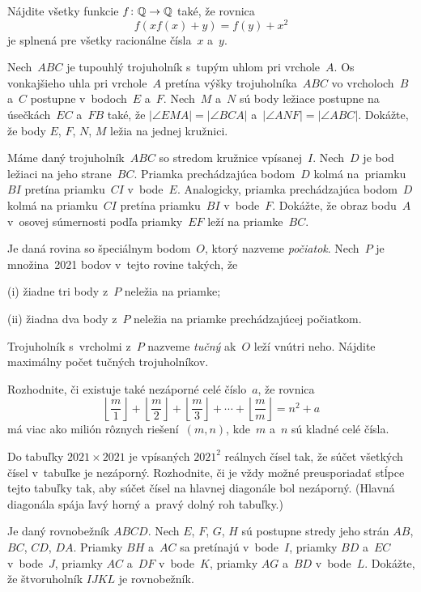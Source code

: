 {%
Nájdite všetky funkcie $f\colon\Bbb{Q}\to\Bbb{Q}$ také, že rovnica
$$
f(xf(x)+y)=f(y)+x^2
$$
je splnená pre všetky racionálne čísla~$x$ a~$y$.
}

{%
Nech~$ABC$ je tupouhlý trojuholník s~tupým uhlom pri vrchole~$A$. Os vonkajšieho uhla pri vrchole~$A$ pretína výšky trojuholníka~$ABC$ vo vrcholoch~$B$ a~$C$ postupne v~bodoch~$E$ a~$F$. Nech~$M$ a~$N$ sú body ležiace postupne na úsečkách~$EC$ a~$FB$ také, že $|\angle EMA| = |\angle BCA|$ a~$|\angle ANF| = |\angle ABC|$. Dokážte, že body $E$, $F$, $N$, $M$ ležia na jednej kružnici.
}

{%
Máme daný trojuholník~$ABC$ so stredom kružnice vpísanej~$I$. Nech~$D$ je bod ležiaci na jeho strane~$BC$. Priamka prechádzajúca bodom~$D$ kolmá na~priamku~$BI$ pretína priamku~$CI$ v~bode~$E$. Analogicky, priamka prechádzajúca bodom~$D$ kolmá na priamku~$CI$ pretína priamku~$BI$ v~bode~$F$. Dokážte, že obraz bodu~$A$ v~osovej súmernosti podľa priamky~$EF$ leží na priamke~$BC$.
}

{%
Je daná rovina so špeciálnym bodom~$O$, ktorý nazveme \emph{počiatok}. Nech~$P$ je množina~2021 bodov v~tejto rovine takých, že
\item{(i)} žiadne tri body z~$P$ neležia na priamke;
\item{(ii)} žiadna dva body z~$P$ neležia na priamke prechádzajúcej počiatkom.

Trojuholník s~vrcholmi z~$P$ nazveme \emph{tučný} ak~$O$ leží vnútri neho. Nájdite maximálny počet tučných trojuholníkov.
}

{%
Rozhodnite, či existuje také nezáporné celé číslo~$a$, že rovnica
$$
\left\lfloor\frac{m}{1}\right\rfloor + \left\lfloor\frac{m}{2}\right\rfloor +
\left\lfloor\frac{m}{3}\right\rfloor + \cdots +
\left\lfloor\frac{m}{m}\right\rfloor = n^2 + a
$$
má viac ako milión rôznych riešení~$(m,n)$, kde~$m$ a~$n$ sú kladné celé čísla.
}

{%
 Do tabuľky $2021 \times 2021$ je vpísaných $2021^2$ reálnych čísel tak, že súčet všetkých čísel v~tabuľke je nezáporný. Rozhodnite, či je vždy možné preusporiadať stĺpce tejto tabuľky tak, aby súčet čísel na hlavnej diagonále bol nezáporný. (Hlavná diagonála spája ľavý horný a~pravý dolný roh tabuľky.)
}

{%
Je daný rovnobežník $ABCD$. Nech $E$, $F$, $G$, $H$ sú postupne stredy jeho strán $AB$, $BC$, $CD$, $DA$. Priamky $BH$ a~$AC$ sa pretínajú v~bode~$I$, priamky $BD$ a~$EC$ v~bode~$J$, priamky $AC$ a~$DF$ v~bode~$K$, priamky $AG$ a~$BD$ v~bode~$L$. Dokážte, že štvoruholník $IJKL$ je rovnobežník.
}

